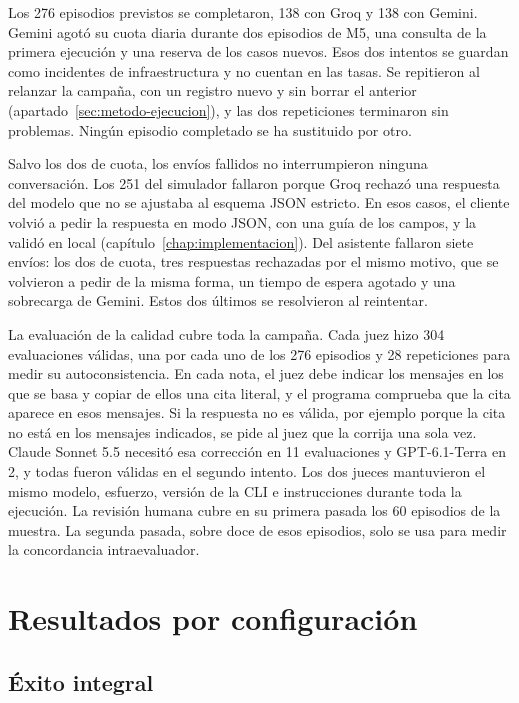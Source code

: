 Los 276 episodios previstos se completaron, 138 con Groq y 138 con Gemini.
Gemini agotó su cuota diaria durante dos episodios de M5, una consulta de la
primera ejecución y una reserva de los casos nuevos. Esos dos intentos se
guardan como incidentes de infraestructura y no cuentan en las tasas. Se
repitieron al relanzar la campaña, con un registro nuevo y sin borrar el
anterior (apartado~\ref{sec:metodo-ejecucion}), y las dos repeticiones
terminaron sin problemas. Ningún episodio completado se ha sustituido por otro.

Salvo los dos de cuota, los envíos fallidos no interrumpieron ninguna
conversación. Los 251 del simulador fallaron porque Groq rechazó una respuesta
del modelo que no se ajustaba al esquema JSON estricto. En esos casos, el
cliente volvió a pedir la respuesta en modo JSON, con una guía de los campos, y
la validó en local (capítulo~\ref{chap:implementacion}). Del asistente fallaron
siete envíos: los dos de cuota, tres respuestas rechazadas por el mismo motivo,
que se volvieron a pedir de la misma forma, un tiempo de espera agotado y una
sobrecarga de Gemini. Estos dos últimos se resolvieron al reintentar.

La evaluación de la calidad cubre toda la campaña. Cada juez hizo 304
evaluaciones válidas, una por cada uno de los 276 episodios y 28 repeticiones
para medir su autoconsistencia. En cada nota, el juez debe indicar los mensajes
en los que se basa y copiar de ellos una cita literal, y el programa comprueba
que la cita aparece en esos mensajes. Si la respuesta no es válida, por ejemplo
porque la cita no está en los mensajes indicados, se pide al juez que la
corrija una sola vez. Claude Sonnet 5.5 necesitó esa corrección en 11
evaluaciones y GPT-6.1-Terra en 2, y todas fueron válidas en el segundo
intento. Los dos jueces mantuvieron el mismo modelo, esfuerzo, versión de la
CLI e instrucciones durante toda la ejecución. La revisión humana cubre en su
primera pasada los 60 episodios de la muestra. La segunda pasada, sobre doce de
esos episodios, solo se usa para medir la concordancia intraevaluador.

\section{Resultados por configuración}
\label{sec:resultados-config}

\subsection{Éxito integral}

